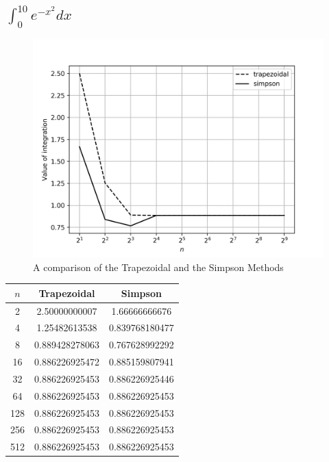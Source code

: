 \documentclass[12,a4paper]{article}
\begin{document}
    \subsection{$\int_0^{10} e^{-x^2}dx$}
    \begin{figure}[H]
        \centering
        \includegraphics[width=\textwidth]{plots/q2a.png}
        \caption{A comparison of the Trapezoidal and the Simpson Methods}
        \label{fig:my_label}
    \end{figure}
    \begin{table}[H]
        \centering
        \begin{tabular}{ |c|c|c| }
            \hline
            $n$ & \textbf{Trapezoidal} & \textbf{Simpson}\\
            \hline
            2 & 2.50000000007 & 1.66666666676 \\
            4 & 1.25482613538 & 0.839768180477 \\
            8 & 0.889428278063 & 0.767628992292 \\
            16 & 0.886226925472 & 0.885159807941 \\
            32 & 0.886226925453 & 0.886226925446 \\
            64 & 0.886226925453 & 0.886226925453 \\
            128 & 0.886226925453 & 0.886226925453 \\
            256 & 0.886226925453 & 0.886226925453 \\
            512 & 0.886226925453 & 0.886226925453 \\
            \hline
        \end{tabular}
    \end{table}
    \newpage
\end{document}
